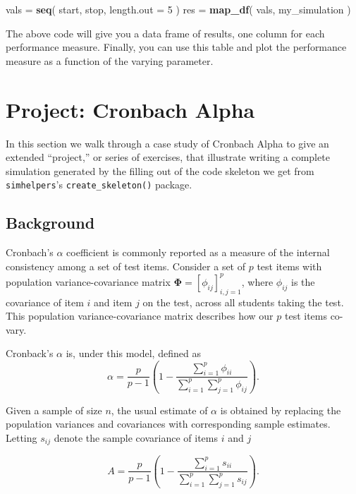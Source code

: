 \documentclass[
]{book}
\newenvironment{Shaded}{\begin{snugshade}}{\end{snugshade}}
\newcommand{\AttributeTok}[1]{\textcolor[rgb]{0.13,0.29,0.53}{#1}}
\newcommand{\DecValTok}[1]{\textcolor[rgb]{0.00,0.00,0.81}{#1}}
\newcommand{\FunctionTok}[1]{\textcolor[rgb]{0.13,0.29,0.53}{\textbf{#1}}}
\newcommand{\NormalTok}[1]{#1}
\newcommand{\OtherTok}[1]{\textcolor[rgb]{0.56,0.35,0.01}{#1}}
\begin{document}
\begin{Shaded}
\begin{Highlighting}[]
\NormalTok{vals }\OtherTok{=} \FunctionTok{seq}\NormalTok{( start, stop, }\AttributeTok{length.out =} \DecValTok{5}\NormalTok{ )}
\NormalTok{res }\OtherTok{=} \FunctionTok{map\_df}\NormalTok{( vals, my\_simulation ) }
\end{Highlighting}
\end{Shaded}

The above code will give you a data frame of results, one column for each performance measure.
Finally, you can use this table and plot the performance measure as a function of the varying parameter.

\chapter{Project: Cronbach Alpha}\label{case_Cronbach}

In this section we walk through a case study of Cronbach Alpha to give an extended ``project,'' or series of exercises, that illustrate writing a complete simulation generated by the filling out of the code skeleton we get from \texttt{simhelpers}'s \texttt{create\_skeleton()} package.

\section{Background}\label{background}

Cronbach's \(\alpha\) coefficient is commonly reported as a measure of the internal consistency among a set of test items. Consider a set of \(p\) test items with population variance-covariance matrix \(\boldsymbol\Phi = \left[\phi_{ij}\right]_{i,j=1}^p\), where \(\phi_{ij}\) is the covariance of item \(i\) and item \(j\) on the test, across all students taking the test.
This population variance-covariance matrix describes how our \(p\) test items co-vary.

Cronback's \(\alpha\) is, under this model, defined as
\[
\alpha = \frac{p}{p - 1}\left(1 - \frac{\sum_{i=1}^p \phi_{ii}}{\sum_{i=1}^p \sum_{j=1}^p \phi_{ij}}\right).
\]

Given a sample of size \(n\), the usual estimate of \(\alpha\) is obtained by replacing the population variances and covariances with corresponding sample estimates. Letting \(s_{ij}\) denote the sample covariance of items \(i\) and \(j\)

\[
A = \frac{p}{p - 1}\left(1 - \frac{\sum_{i=1}^p s_{ii}}{\sum_{i=1}^p \sum_{j=1}^p s_{ij}}\right).
\]
\end{document}
